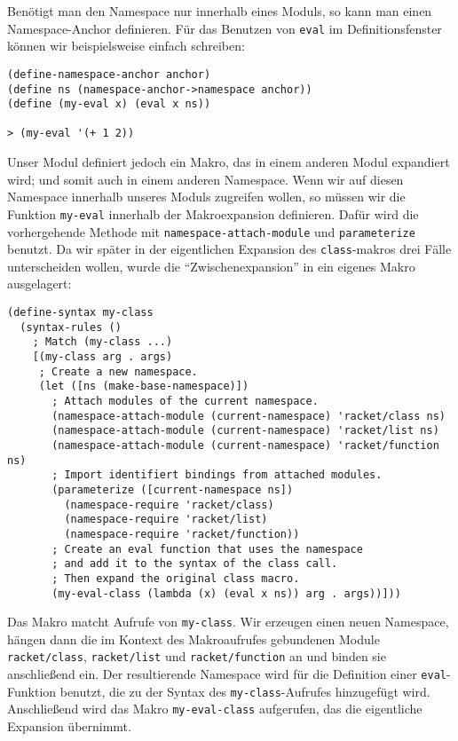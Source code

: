 Benötigt man den Namespace nur innerhalb eines Moduls, so kann man einen Name\-space-An\-chor definieren. Für das Benutzen von \texttt{eval} im Definitionsfenster können wir beispielsweise einfach schreiben:

\begin{lstlisting}
(define-namespace-anchor anchor)
(define ns (namespace-anchor->namespace anchor))
(define (my-eval x) (eval x ns))

> (my-eval '(+ 1 2))
\end{lstlisting}
{}

Unser Modul definiert jedoch ein Makro, das in einem anderen Modul expandiert wird; und somit auch in einem anderen Namespace. Wenn wir auf diesen Namespace innerhalb unseres Moduls zugreifen wollen, so müssen wir die Funktion \texttt{my-eval} innerhalb der Makroexpansion definieren. Dafür wird die vorhergehende Methode mit \texttt{namespace-attach-module} und \texttt{parameterize} benutzt. Da wir später in der eigentlichen Expansion des \texttt{class}-makros drei Fälle unterscheiden wollen, wurde die ``Zwischenexpansion'' in ein eigenes Makro ausgelagert:

\begin{lstlisting}
(define-syntax my-class
  (syntax-rules ()
    ; Match (my-class ...)
    [(my-class arg . args)
     ; Create a new namespace.
     (let ([ns (make-base-namespace)])
       ; Attach modules of the current namespace.
       (namespace-attach-module (current-namespace) 'racket/class ns)
       (namespace-attach-module (current-namespace) 'racket/list ns)
       (namespace-attach-module (current-namespace) 'racket/function ns)
       ; Import identifiert bindings from attached modules.
       (parameterize ([current-namespace ns])
         (namespace-require 'racket/class)
         (namespace-require 'racket/list)
         (namespace-require 'racket/function))
       ; Create an eval function that uses the namespace
       ; and add it to the syntax of the class call.
       ; Then expand the original class macro.
       (my-eval-class (lambda (x) (eval x ns)) arg . args))]))
\end{lstlisting}

Das Makro matcht Aufrufe von \texttt{my-class}. Wir erzeugen einen neuen Namespace, hängen dann die im Kontext des Makroaufrufes gebundenen Module \texttt{racket/class}, \texttt{racket/list} und \texttt{racket/function} an und binden sie anschließend ein. Der resultierende Namespace wird für die Definition einer \texttt{eval}-Funktion benutzt, die zu der Syntax des \texttt{my-class}-Aufrufes hinzugefügt wird. Anschließend wird das Makro \texttt{my-eval-class} aufgerufen, das die eigentliche Expansion übernimmt.

